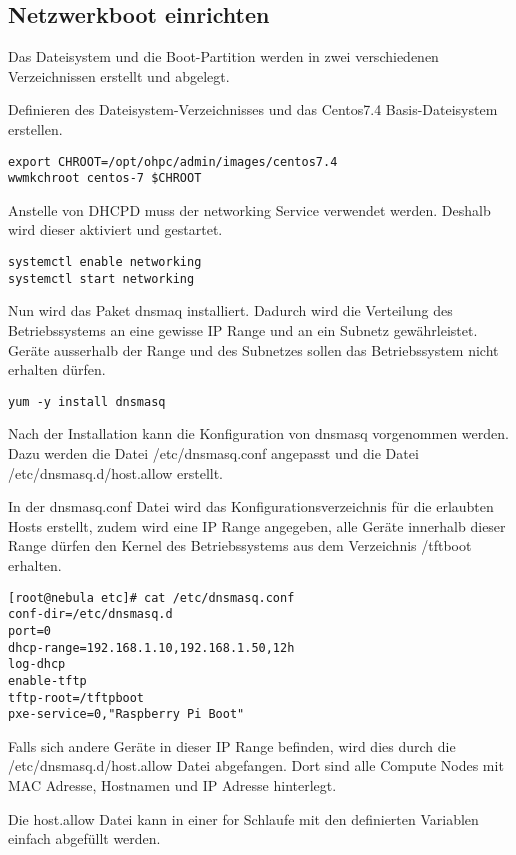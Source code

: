 \subsection{Netzwerkboot einrichten}
Das Dateisystem und die Boot-Partition werden in zwei verschiedenen Verzeichnissen erstellt und abgelegt.

Definieren des Dateisystem-Verzeichnisses und das Centos7.4 Basis-Dateisystem erstellen.
\begin{lstlisting}
export CHROOT=/opt/ohpc/admin/images/centos7.4
wwmkchroot centos-7 $CHROOT
\end{lstlisting}

Anstelle von DHCPD muss der networking Service verwendet werden. Deshalb wird dieser aktiviert und gestartet.
\begin{lstlisting}
systemctl enable networking
systemctl start networking
\end{lstlisting}

Nun wird das Paket dnsmaq installiert. Dadurch wird die Verteilung des Betriebssystems an eine gewisse IP Range und an ein Subnetz gewährleistet. Geräte ausserhalb der Range und des Subnetzes sollen das Betriebssystem nicht erhalten dürfen.

\begin{lstlisting}
yum -y install dnsmasq
\end{lstlisting}

Nach der Installation kann die Konfiguration von dnsmasq vorgenommen werden. Dazu werden die Datei /etc/dnsmasq.conf angepasst und die Datei /etc/dnsmasq.d/host.allow erstellt.

In der dnsmasq.conf Datei wird das Konfigurationsverzeichnis für die erlaubten Hosts erstellt, zudem wird eine IP Range angegeben, alle Geräte innerhalb dieser Range dürfen den Kernel des Betriebssystems aus dem Verzeichnis /tftboot erhalten.  
\begin{lstlisting}
[root@nebula etc]# cat /etc/dnsmasq.conf
conf-dir=/etc/dnsmasq.d
port=0
dhcp-range=192.168.1.10,192.168.1.50,12h
log-dhcp
enable-tftp
tftp-root=/tftpboot
pxe-service=0,"Raspberry Pi Boot"
\end{lstlisting}

Falls sich andere Geräte in dieser IP Range befinden, wird dies durch die /etc/dnsmasq.d/host.allow Datei abgefangen. Dort sind alle Compute Nodes mit MAC Adresse, Hostnamen und IP Adresse hinterlegt.

Die host.allow Datei kann in einer for Schlaufe mit den definierten Variablen einfach abgefüllt werden.


